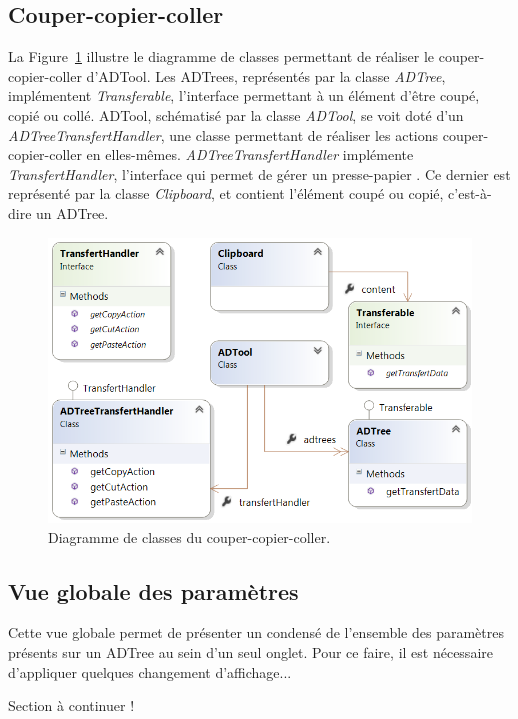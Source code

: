     \subsection{Couper-copier-coller}
		La {\sc Figure}~{\ref{fig:copiercoller}} illustre le diagramme de classes permettant de réaliser le couper-copier-coller d'ADTool. Les ADTrees, représentés par la classe \emph{ADTree}, implémentent \emph{Transferable}, l'interface permettant à un élément d'être coupé, copié ou collé. ADTool, schématisé par la classe \emph{ADTool}, se voit doté d'un \emph{ADTreeTransfertHandler}, une classe permettant de réaliser les actions couper-copier-coller en elles-mêmes. \emph{ADTreeTransfertHandler} implémente \emph{TransfertHandler}, l'interface qui permet de gérer un \og presse-papier \fg{}. Ce dernier est représenté par la classe \emph{Clipboard}, et contient l'élément coupé ou copié, c'est-à-dire un ADTree.
    	
    	\begin{figure}[H]
	        \centering
	        \includegraphics[height=0.6\textwidth]{figure/copiercoller.png}
	        \caption{Diagramme de classes du couper-copier-coller.}
	        \label{fig:copiercoller}
	    \end{figure}
	    
	\subsection{Vue globale des paramètres}
		Cette vue globale permet de présenter un condensé de l'ensemble des paramètres présents sur un ADTree au sein d'un seul onglet. Pour ce faire, il est nécessaire d'appliquer quelques changement d'affichage...
		
		Section à continuer !
	
